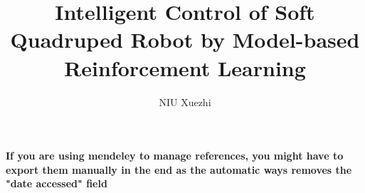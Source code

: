 \documentclass[12pt, openany]{book}
\title{Intelligent Control of Soft Quadruped Robot by Model-based Reinforcement Learning}
\author{NIU Xuezhi}
\begin{document}












% 

\newpage
{}
\textbf{If you are using mendeley to manage references, you might have to export them manually in the end as the automatic ways removes the "date accessed" field}
\printbibliography




\end{document}
